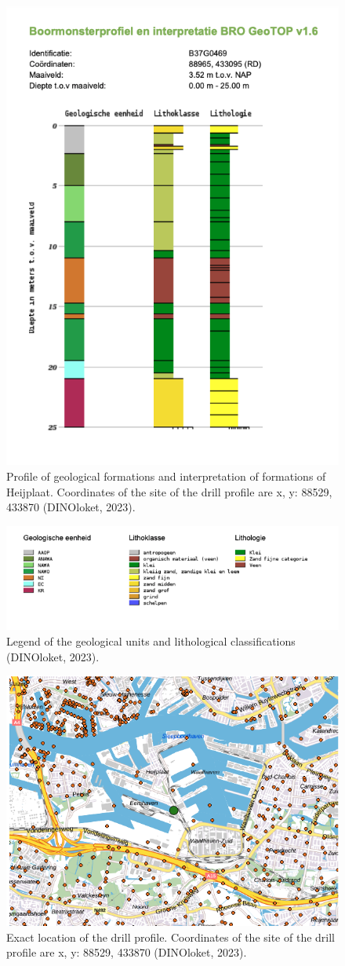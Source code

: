 \begin{figure}[htbp]
    \centering
    \includegraphics[width=0.40\linewidth]{figures/heij/drillsite.png}
    \caption{Profile of geological formations and interpretation of formations of Heijplaat. Coordinates of the site of the drill profile are x, y: 88529, 433870 (DINOloket, 2023).}
\end{figure}
\begin{figure}[htbp]
    \centering
    \includegraphics[width=0.40\linewidth]{figures/heij/litho.png}
    \caption{Legend of the geological units and lithological classifications (DINOloket, 2023).}
\end{figure}


\begin{figure}[htbp]
    \centering
    \includegraphics[width=0.40\linewidth]{figures/heij/boor.png}
    \caption{Exact location of the drill profile. Coordinates of the site of the drill profile are x, y: 88529, 433870 (DINOloket, 2023).}
\end{figure}

